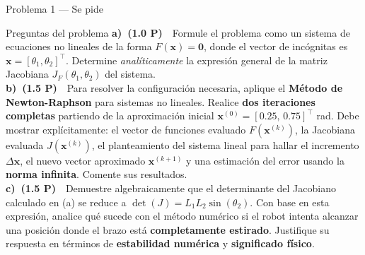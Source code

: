 \documentclass[aspectratio=169,10pt]{beamer}
\begin{document}
\begin{frame}{Problema 1 — Se pide}
\begin{cardidea}{Preguntas del problema}{\faTasks}
{\footnotesize
\textbf{a)\ (1.0 P)}\ \ Formule el problema como un sistema de ecuaciones no lineales de la forma $F(\mathbf{x})=\mathbf{0}$, donde el vector de incógnitas es $\mathbf{x}=[\theta_1,\theta_2]^{\!\top}$. Determine \emph{analíticamente} la expresión general de la matriz Jacobiana $J_F(\theta_1,\theta_2)$ del sistema.\\[1.4mm]
\textbf{b)\ (1.5 P)}\ \ Para resolver la configuración necesaria, aplique el \textbf{Método de Newton-Raphson} para sistemas no lineales. Realice \textbf{dos iteraciones completas} partiendo de la aproximación inicial $\mathbf{x}^{(0)}=[0.25,\,0.75]^{\!\top}$ rad. Debe mostrar explícitamente: el vector de funciones evaluado $F(\mathbf{x}^{(k)})$, la Jacobiana evaluada $J(\mathbf{x}^{(k)})$, el planteamiento del sistema lineal para hallar el incremento $\Delta\mathbf{x}$, el nuevo vector aproximado $\mathbf{x}^{(k+1)}$ y una estimación del error usando la \textbf{norma infinita}. Comente sus resultados.\\[1.4mm]
\textbf{c)\ (1.5 P)}\ \ Demuestre algebraicamente que el determinante del Jacobiano calculado en (a) se reduce a $\det(J)=L_1L_2\sin(\theta_2)$. Con base en esta expresión, analice qué sucede con el método numérico si el robot intenta alcanzar una posición donde el brazo está \textbf{completamente estirado}. Justifique su respuesta en términos de \textbf{estabilidad numérica} y \textbf{significado físico}.}
\end{cardidea}
\end{frame}
\end{document}
